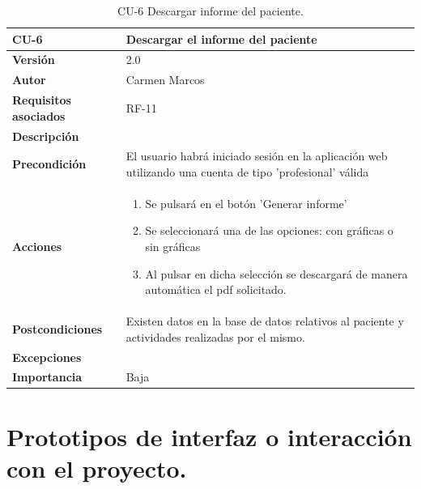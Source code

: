 \begin{table}[p]
	\centering
	\begin{tabularx}{\linewidth}{ p{} p{} }
		\toprule
		\textbf{CU-6}    & \textbf{Descargar el informe del paciente}\\
		\toprule
		\textbf{Versión}              & 2.0    \\
		\textbf{Autor}                & Carmen Marcos \\
		\textbf{Requisitos asociados} & RF-11\\
		\textbf{Descripción}          & 
        \\
		\textbf{Precondición}         & El usuario habrá iniciado sesión en la aplicación web utilizando una cuenta de tipo 'profesional' válida
		\\
		\textbf{Acciones}             & \begin{enumerate} \def\labelenumi{\arabic{enumi}.}
	\tightlist
		\item Se pulsará en el botón 'Generar informe'
        \item Se seleccionará una de las opciones: con gráficas o sin gráficas
        \item Al pulsar en dicha selección se descargará de manera automática el pdf solicitado.
		\end{enumerate}\\
		\textbf{Postcondiciones}        & Existen datos en la base de datos relativos al paciente y actividades realizadas por el mismo.		
  \\
		\textbf{Excepciones}          & \\
		\textbf{Importancia}          & Baja \\
		\bottomrule
	\end{tabularx}
	\caption{CU-6 Descargar informe del paciente.}
        \label{tab:CU-6}
\end{table}
\section{Prototipos de interfaz o interacción con el proyecto.}

